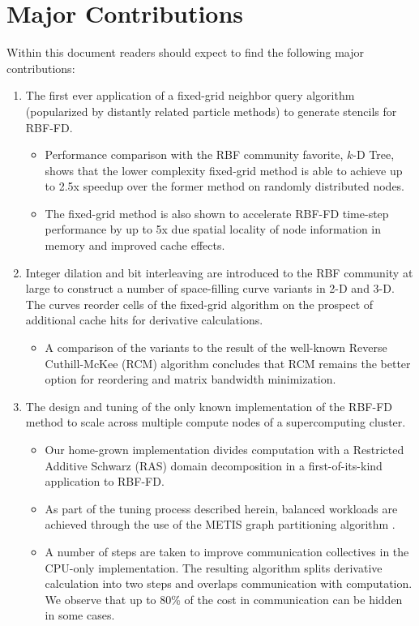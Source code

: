 \documentclass[11pt]{report}
\begin{document}
\section{Major Contributions}

Within this document readers should expect to find the following major contributions: 
\begin{enumerate} 
\item The first ever application of a fixed-grid neighbor query algorithm (popularized by distantly related particle methods) to generate stencils for RBF-FD. 
\begin{itemize} 
\item Performance comparison with the RBF community favorite, $k$-D Tree, shows that the lower complexity fixed-grid method is able to achieve up to 2.5x speedup over the former method on randomly distributed nodes. 
\item The fixed-grid method is also shown to accelerate RBF-FD time-step performance by up to 5x due spatial locality of node information in memory and improved cache effects.
\end{itemize} 
\item Integer dilation and bit interleaving are introduced to the RBF community at large to construct a number of space-filling curve variants in 2-D and 3-D. The curves reorder cells of the fixed-grid algorithm on the prospect of additional cache hits for derivative calculations. 
\begin{itemize} 
\item A comparison of the variants to the result of the well-known Reverse Cuthill-McKee (RCM) algorithm concludes that RCM remains the better option for reordering and matrix bandwidth minimization.
\end{itemize} 
\item The design and tuning of the only known implementation of the RBF-FD method to scale across multiple compute nodes of a supercomputing cluster.
\begin{itemize} 
\item Our home-grown implementation divides computation with a Restricted Additive Schwarz (RAS) domain decomposition in a first-of-its-kind application to RBF-FD. %
\item As part of the tuning process described herein, balanced workloads are achieved through the use of the METIS graph partitioning algorithm \cite{Karypis1999}.  
\item A number of steps are taken to improve communication collectives in the CPU-only implementation. The resulting algorithm splits derivative calculation into two steps and overlaps communication with computation. We observe that up to 80\% of the cost in communication can be hidden in some cases. 

\end{itemize}
\end{enumerate}
\end{document}
